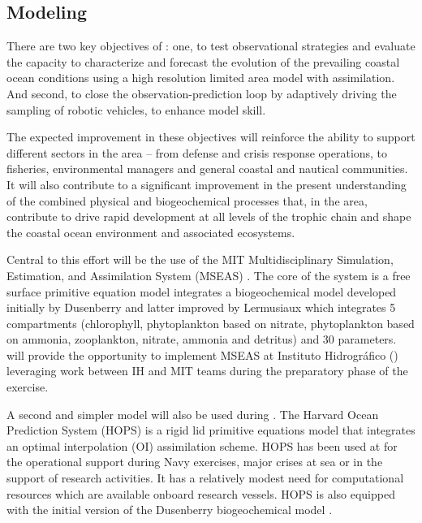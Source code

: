 
\subsection{Modeling}

There are two key objectives of \proje: one, to test observational
strategies and evaluate the capacity to characterize and forecast the
evolution of the prevailing coastal ocean conditions using a high
resolution limited area model with assimilation. And second, to close
the observation-prediction loop by adaptively driving the sampling of
robotic vehicles, to enhance model skill.

The expected improvement in these objectives will reinforce the
ability to support different sectors in the area -- from defense and
crisis response operations, to fisheries, environmental managers and
general coastal and nautical communities. It will also contribute to a
significant improvement in the present understanding of the combined
physical and biogeochemical processes that, in the \naz area,
contribute to drive rapid development at all levels of the trophic
chain and shape the coastal ocean environment and associated
ecosystems.

Central to this effort will be the use of the MIT Multidisciplinary
Simulation, Estimation, and Assimilation System (MSEAS)
. The core of the system is a free surface primitive
equation model  integrates a
biogeochemical model developed initially by Dusenberry 
and latter improved by Lermusiaux  which integrates 5
compartments (chlorophyll, phytoplankton based on nitrate,
phytoplankton based on ammonia, zooplankton, nitrate, ammonia and
detritus) and 30 parameters. \proj will provide the opportunity to
implement MSEAS at Instituto Hidrogr\'{a}fico (\inste) leveraging work
between IH and MIT teams during the preparatory phase of the exercise.

A second and simpler model will also be used during \proje.  The
Harvard Ocean Prediction System (HOPS) is a rigid lid primitive
equations model that integrates an optimal interpolation (OI)
assimilation scheme. HOPS has been used at \inst for the operational
support during Navy exercises, major crises at sea or in the support
of research activities. It has a relatively modest need for
computational resources which are available onboard research
vessels. HOPS is also equipped with the initial version of the
Dusenberry biogeochemical model .


